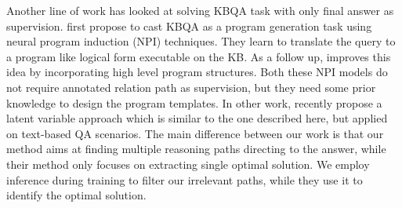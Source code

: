 
Another line of work has looked at solving KBQA task with only final answer as supervision.  first propose to cast KBQA as a program generation task using neural program induction (NPI) techniques. They learn to translate the query to a program like logical form executable on the KB. As a follow up,  improves this idea by incorporating high level program structures. Both these NPI models do not require annotated relation path as supervision, but they need some prior knowledge to design the program templates. In other work,  recently propose a latent variable approach which is similar to the one described here, but applied on text-based QA scenarios. The main difference between our work is that our method aims at finding multiple reasoning paths directing to the answer, while their method only focuses on extracting single optimal solution. We employ inference during training to filter our irrelevant paths, while they use it to identify the optimal solution.
